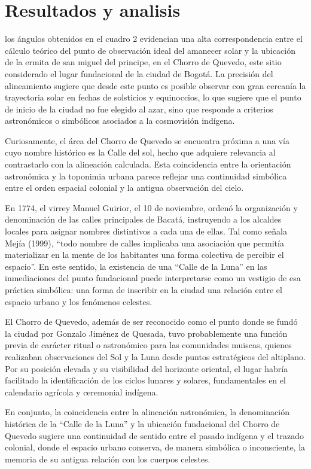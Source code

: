 \documentclass[a4paper,alpha-refs]{eSpectra}
\begin{document}
\justifying


\section{Resultados y analisis}
los ángulos obtenidos en el cuadro 2 evidencian una alta correspondencia entre el cálculo teórico del punto de observación ideal del amanecer solar y la ubicación de la ermita de san miguel del principe, en el Chorro de Quevedo, este sitio considerado el lugar fundacional de la ciudad de Bogotá. La precisión del alineamiento sugiere que desde este punto es posible observar con gran cercanía la trayectoria solar en fechas de solsticios y equinoccios, lo que sugiere  que el punto de inicio de la ciudad no fue elegido al azar, sino que responde a criterios astronómicos o simbólicos asociados a la cosmovisión indígena.

Curiosamente, el área del Chorro de Quevedo se encuentra próxima a una vía cuyo nombre histórico es la Calle del sol, hecho que adquiere relevancia al contrastarlo con la alineación calculada. Esta coincidencia entre la orientación astronómica y la toponimia urbana parece reflejar una continuidad simbólica entre el orden espacial colonial y la antigua observación del cielo.

En 1774, el virrey Manuel Guirior, el 10 de noviembre, ordenó la organización y denominación de las calles principales de Bacatá, instruyendo a los alcaldes locales para asignar nombres distintivos a cada una de ellas. Tal como señala Mejía (1999), “todo nombre de calles implicaba una asociación que permitía materializar en la mente de los habitantes una forma colectiva de percibir el espacio”. En este sentido, la existencia de una “Calle de la Luna” en las inmediaciones del punto fundacional puede interpretarse como un vestigio de esa práctica simbólica: una forma de inscribir en la ciudad una relación entre el espacio urbano y los fenómenos celestes.

El Chorro de Quevedo, además de ser reconocido como el punto donde se fundó la ciudad por Gonzalo Jiménez de Quesada, tuvo probablemente una función previa de carácter ritual o astronómico para las comunidades muiscas, quienes realizaban observaciones del Sol y la Luna desde puntos estratégicos del altiplano. Por su posición elevada y su visibilidad del horizonte oriental, el lugar habría facilitado la identificación de los ciclos lunares y solares, fundamentales en el calendario agrícola y ceremonial indígena.

En conjunto, la coincidencia entre la alineación astronómica, la denominación histórica de la “Calle de la Luna” y la ubicación fundacional del Chorro de Quevedo sugiere una continuidad de sentido entre el pasado indígena y el trazado colonial, donde el espacio urbano conserva, de manera simbólica o inconsciente, la memoria de su antigua relación con los cuerpos celestes.
\end{document}
